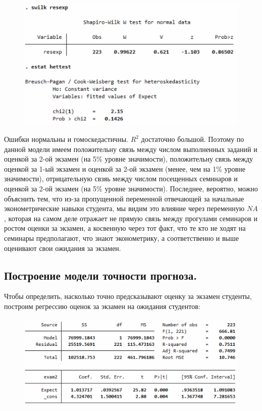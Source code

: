 \documentclass[12pt,a4paper, oneside]{extreport}
\begin{document}
\begin{figure}[h!]
	\centering
	\includegraphics[width=0.7\linewidth]{screenshot014}
	\label{fig:screenshot014}
\end{figure}


Ошибки нормальны и гомоскедастичны. $R^2$ достаточно большой. Поэтому по данной модели имеем положительну связь между числом выполненных заданий и оценкой за 2-ой экзамен (на 5\% уровне значимости), положительну связь между оценкой за 1-ый экзамен и оценкой за 2-ой экзамен (менее, чем на 1\% уровне значимости), отрицательную свзяь между числом посещенных семинаров и оценкой за 2-ой экзамен (на 5\% уровне значимости). Последнее, вероятно, можно объяснить тем, что из-за пропущенной переменной отвечающей за начальные эконометрические навыки студента, мы видим это влияние через переменную $NA$, которая на самом деле отражает не прямую связь между прогулами семинаров и ростом оценки за экзамен, а косвенную через тот факт, что те кто не ходят на семинары предполагают, что знают эконометрику, а соответственно и выше оценивают свои ожидания за экзамен.    
 

\subsection{Построение модели  точности прогноза.}


Чтобы определить, насколько точно предсказывают оценку за экзамен студенты, построим регрессию оценок за экзамен на ожидания студентов:

\begin{figure}[h!]
	\centering
	\includegraphics[width=0.7\linewidth]{screenshot015}
	\label{fig:screenshot015}
\end{figure}
\end{document}

